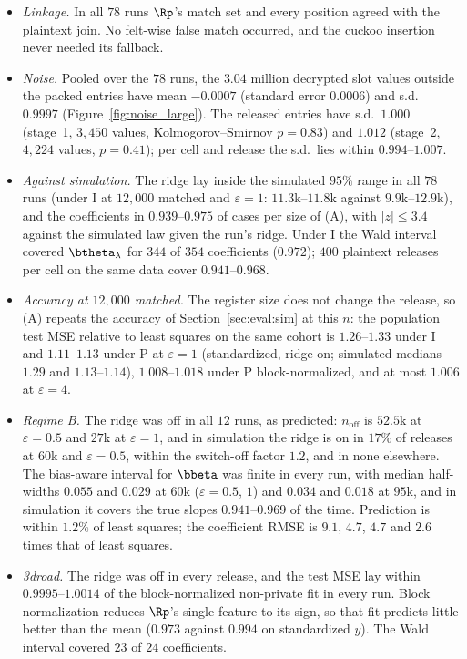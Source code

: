 \begin{itemize}[noitemsep]
  \item \emph{Linkage.} In all $78$ runs $\Rp$'s match set and every position agreed with the plaintext join. No felt-wise false match occurred, and the cuckoo insertion never needed its fallback.
  \item \emph{Noise.} Pooled over the $78$ runs, the $3.04$ million decrypted slot values outside the packed entries have mean $-0.0007$ (standard error $0.0006$) and s.d.\ $0.9997$ (Figure~\ref{fig:noise_large}). The released entries have s.d.\ $1.000$ (stage~1, $3{,}450$ values, Kolmogorov--Smirnov $p = 0.83$) and $1.012$ (stage~2, $4{,}224$ values, $p = 0.41$); per cell and release the s.d.\ lies within $0.994$--$1.007$.
  \item \emph{Against simulation.} The ridge lay inside the simulated $95\%$ range in all $78$ runs (under I at $12{,}000$ matched and $\varepsilon = 1$: $11.3$k--$11.8$k against $9.9$k--$12.9$k), and the coefficients in $0.939$--$0.975$ of cases per size of (A), with $|z| \le 3.4$ against the simulated law given the run's ridge. Under I the Wald interval covered $\btheta_\lambda$ for $344$ of $354$ coefficients ($0.972$); $400$ plaintext releases per cell on the same data cover $0.941$--$0.968$.
  \item \emph{Accuracy at $12{,}000$ matched.} The register size does not change the release, so (A) repeats the accuracy of Section~\ref{sec:eval:sim} at this $n$: the population test MSE relative to least squares on the same cohort is $1.26$--$1.33$ under I and $1.11$--$1.13$ under P at $\varepsilon = 1$ (standardized, ridge on; simulated medians $1.29$ and $1.13$--$1.14$), $1.008$--$1.018$ under P block-normalized, and at most $1.006$ at $\varepsilon = 4$.
  \item \emph{Regime B.} The ridge was off in all $12$ runs, as predicted: $n_{\mathrm{off}}$ is $52.5$k at $\varepsilon = 0.5$ and $27$k at $\varepsilon = 1$, and in simulation the ridge is on in $17\%$ of releases at $60$k and $\varepsilon = 0.5$, within the switch-off factor $1.2$, and in none elsewhere. The bias-aware interval for $\bbeta$ was finite in every run, with median half-widths $0.055$ and $0.029$ at $60$k ($\varepsilon = 0.5$, $1$) and $0.034$ and $0.018$ at $95$k, and in simulation it covers the true slopes $0.941$--$0.969$ of the time. Prediction is within $1.2\%$ of least squares; the coefficient RMSE is $9.1$, $4.7$, $4.7$ and $2.6$ times that of least squares.
  \item \emph{3droad.} The ridge was off in every release, and the test MSE lay within $0.9995$--$1.0014$ of the block-normalized non-private fit in every run. Block normalization reduces $\Rp$'s single feature to its sign, so that fit predicts little better than the mean ($0.973$ against $0.994$ on standardized $y$). The Wald interval covered $23$ of $24$ coefficients.
\end{itemize}
